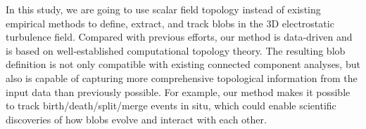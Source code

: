 In this study, we are going to use scalar field topology instead of existing empirical methods to define, extract, and track blobs in the 3D electrostatic turbulence field.  Compared with previous efforts, our method is data-driven and is based on well-established computational topology theory.  The resulting blob definition is not only compatible with existing connected component analyses, but also is capable of capturing more comprehensive topological information from the input data than previously possible.  For example, our method makes it possible to track birth/death/split/merge events in situ, which could enable scientific discoveries of how blobs evolve and interact with each other.  




